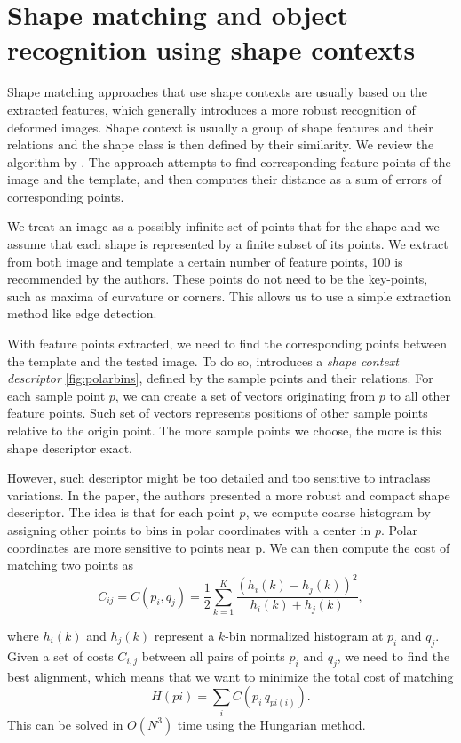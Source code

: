 \section{Shape matching and object recognition using shape contexts}
Shape matching approaches that use shape contexts are usually based on the extracted features, which generally introduces a more robust recognition of deformed images. Shape context is usually a group of shape features and their relations and the shape class is then defined by their similarity. We review the algorithm by \citet{simple}. The approach attempts to find corresponding feature points of the image and the template, and then computes their distance as a sum of errors of corresponding points.

We treat an image as a possibly infinite set of points that for the shape and we assume that each shape is represented by a finite subset of its points. We extract from both image and template a certain number of feature points, 100 is recommended by the authors. These points do not need to be the key-points, such as maxima of curvature or corners. This allows us to use a simple extraction method like edge detection.

With feature points extracted, we need to find the corresponding points between the template and the tested image. To do so, \citet{simple} introduces a \emph{shape context descriptor} \ref{fig:polarbins}, defined by the sample points and their relations. For each sample point $p$, we can create a set of vectors originating from $p$ to all other feature points. Such set of vectors represents positions of other sample points relative to the origin point. The more sample points we choose, the more is this shape descriptor exact.

However, such descriptor might be too detailed and too sensitive to intraclass variations. In the paper, the authors presented a more robust and compact shape descriptor. The idea is that for each point $p$, we compute coarse histogram by assigning other points to bins in polar coordinates with a center in $p$. Polar coordinates are more sensitive to points near p. We can then compute the cost of matching two points as
\[ C_{ij} =  C(p_{i},q_{j}) = \frac{1}{2} \sum_{k=1}^{K} \frac{(h_{i}(k) - h_{j}(k))^2}{h_{i}(k) + h_{j}(k)}, \]

where $ h_{i}(k) $ and $ h_{j}(k) $ represent a $k$-bin normalized histogram at $p_{i}$ and $q_{j}$. Given a set of costs $C_{i,j}$ between all pairs of points $p_{i}$ and $q_{j}$, we need to find the best alignment, which means that we want to minimize the total cost of matching
\[ H(pi) = \sum_{i} C(p_{i}\,q_{pi(i)}). \]
This can be solved in $O(N^3)$ time using the Hungarian method\cite{simple}. 

